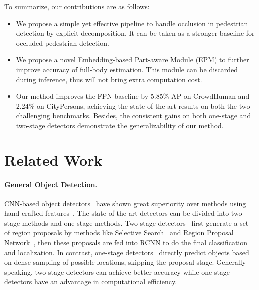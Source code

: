 \documentclass[10pt,twocolumn,letterpaper]{article}
\begin{document}
To summarize, our contributions are as follows:
\begin{itemize}
  \item We propose a simple yet effective pipeline to handle occlusion in pedestrian detection by explicit decomposition. It can be taken as a stronger baseline for occluded pedestrian detection.
 \item We propose a novel Embedding-based Part-aware Module (EPM) to further improve accuracy of full-body estimation. This module can be discarded during inference, thus will not bring extra computation cost.
  \item Our method improves the FPN baseline by 5.85\% AP on CrowdHuman and 2.24\%  on CityPersons, achieving the state-of-the-art results on both the two challenging benchmarks. Besides, the consistent gains on both one-stage and two-stage detectors demonstrate the generalizability of our method.
\end{itemize}













\section{Related Work}
\paragraph{General Object Detection.}
CNN-based object detectors~\cite{ren2015faster, yolo, liu2016ssd, lin2017focal} have shown great superiority over methods using hand-crafted features~\cite{dollar2014fast, papageorgiou2000trainable}. The state-of-the-art detectors can be divided into two-stage methods and one-stage methods. Two-stage detectors~\cite{girshick2014rich, girshick2015fast, ren2015faster, cai2019cascadercnn} first generate a set of region proposals by methods like Selective Search~\cite{uijlings2013selective} and Region Proposal Network~\cite{ren2015faster}, then these proposals are fed into RCNN to do the final classification and localization. In contrast, one-stage detectors~\cite{yolov3, liu2016ssd, lin2017focal} directly predict objects based on dense sampling of possible locations, skipping the proposal stage. Generally speaking, two-stage detectors can achieve better accuracy while one-stage detectors have an advantage in computational efficiency.
\end{document}
